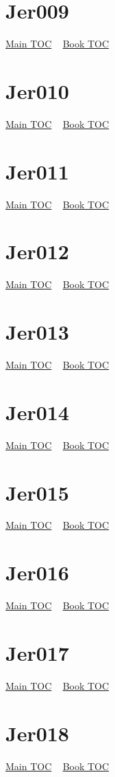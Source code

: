 \documentclass{book}
\begin{document}
  \section{Jer009}\hyperlink{toc}{Main TOC} ~ \hyperref[subsec:Jer]{Book TOC} 
  \section{Jer010}\hyperlink{toc}{Main TOC} ~ \hyperref[subsec:Jer]{Book TOC} 
  \section{Jer011}\hyperlink{toc}{Main TOC} ~ \hyperref[subsec:Jer]{Book TOC} 
  \section{Jer012}\hyperlink{toc}{Main TOC} ~ \hyperref[subsec:Jer]{Book TOC} 
  \section{Jer013}\hyperlink{toc}{Main TOC} ~ \hyperref[subsec:Jer]{Book TOC} 
  \section{Jer014}\hyperlink{toc}{Main TOC} ~ \hyperref[subsec:Jer]{Book TOC} 
  \section{Jer015}\hyperlink{toc}{Main TOC} ~ \hyperref[subsec:Jer]{Book TOC} 
  \section{Jer016}\hyperlink{toc}{Main TOC} ~ \hyperref[subsec:Jer]{Book TOC} 
  \section{Jer017}\hyperlink{toc}{Main TOC} ~ \hyperref[subsec:Jer]{Book TOC} 
  \section{Jer018}\hyperlink{toc}{Main TOC} ~ \hyperref[subsec:Jer]{Book TOC} 
\end{document}
